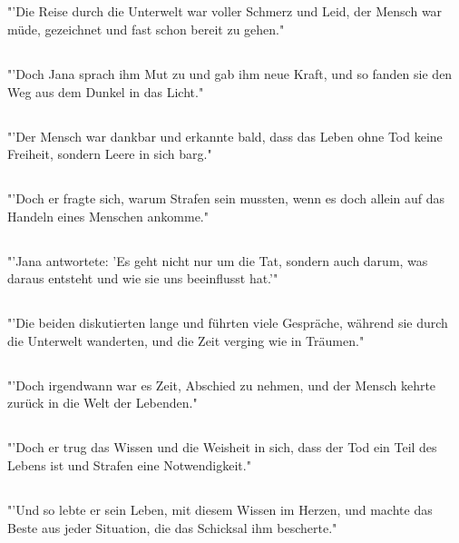 \documentclass{article}
\begin{document}
\subsection{}
"'Die Reise durch die Unterwelt war voller Schmerz und Leid, der Mensch war müde, gezeichnet und fast schon bereit zu gehen."
\subsection{}
"'Doch Jana sprach ihm Mut zu und gab ihm neue Kraft, und so fanden sie den Weg aus dem Dunkel in das Licht."
\subsection{}
"'Der Mensch war dankbar und erkannte bald, dass das Leben ohne Tod keine Freiheit, sondern Leere in sich barg."
\subsection{}
"'Doch er fragte sich, warum Strafen sein mussten, wenn es doch allein auf das Handeln eines Menschen ankomme."
\subsection{}
"'Jana antwortete: 'Es geht nicht nur um die Tat, sondern auch darum, was daraus entsteht und wie sie uns beeinflusst hat.'"
\subsection{}
"'Die beiden diskutierten lange und führten viele Gespräche, während sie durch die Unterwelt wanderten, und die Zeit verging wie in Träumen."
\subsection{}
"'Doch irgendwann war es Zeit, Abschied zu nehmen, und der Mensch kehrte zurück in die Welt der Lebenden."
\subsection{}
"'Doch er trug das Wissen und die Weisheit in sich, dass der Tod ein Teil des Lebens ist und Strafen eine Notwendigkeit."
\subsection{}
"'Und so lebte er sein Leben, mit diesem Wissen im Herzen, und machte das Beste aus jeder Situation, die das Schicksal ihm bescherte."
\end{document}
